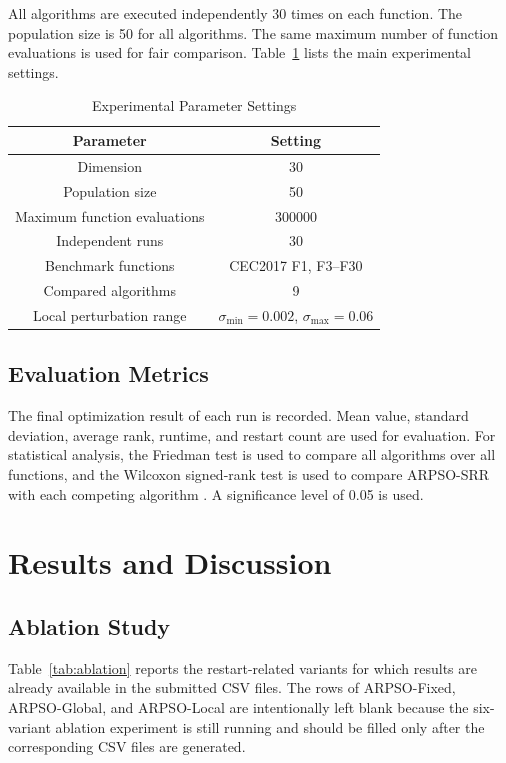 \documentclass[conference]{IEEEtran}
\begin{document}
All algorithms are executed independently 30 times on each function. The population size is 50 for all algorithms. The same maximum number of function evaluations is used for fair comparison. Table~\ref{tab:parameters} lists the main experimental settings.

\begin{table}[!t]
\caption{Experimental Parameter Settings}
\centering
\begin{tabular}{cc}
\toprule
Parameter & Setting \\
\midrule
Dimension & 30 \\
Population size & 50 \\
Maximum function evaluations & 300000 \\
Independent runs & 30 \\
Benchmark functions & CEC2017 F1, F3--F30 \\
Compared algorithms & 9 \\
Local perturbation range & $\sigma_{\min}=0.002$, $\sigma_{\max}=0.06$ \\
\bottomrule
\end{tabular}
\label{tab:parameters}
\end{table}

\subsection{Evaluation Metrics}
The final optimization result of each run is recorded. Mean value, standard deviation, average rank, runtime, and restart count are used for evaluation. For statistical analysis, the Friedman test is used to compare all algorithms over all functions, and the Wilcoxon signed-rank test is used to compare ARPSO-SRR with each competing algorithm \cite{b8,b9,b10}. A significance level of 0.05 is used.

\section{Results and Discussion}\label{sec:results}

\subsection{Ablation Study}
Table~\ref{tab:ablation} reports the restart-related variants for which results are already available in the submitted CSV files. The rows of ARPSO-Fixed, ARPSO-Global, and ARPSO-Local are intentionally left blank because the six-variant ablation experiment is still running and should be filled only after the corresponding CSV files are generated.
\end{document}
